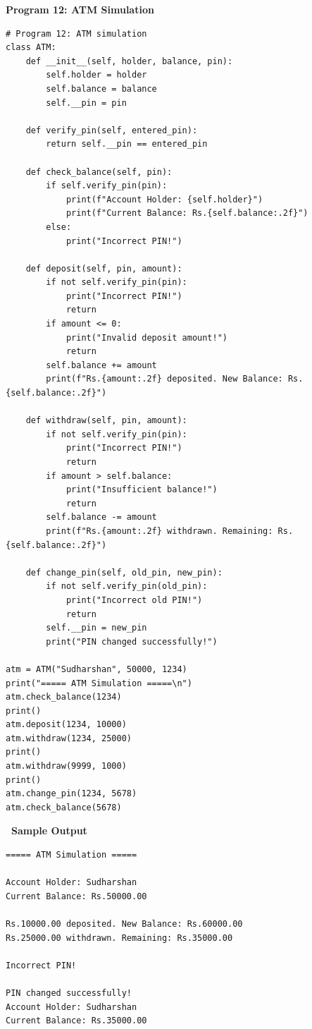 \documentclass[12pt,a4paper]{article}
\newcommand{\outhead}{\noindent\colorbox{cmrgreen!25}%
  {\textbf{\small\color{cmrdark}~Sample Output~}}\par\vspace{-1pt}}
\begin{document}
\vspace{0.5cm}

\textbf{Program 12: ATM Simulation}

\begin{lstlisting}
# Program 12: ATM simulation
class ATM:
    def __init__(self, holder, balance, pin):
        self.holder = holder
        self.balance = balance
        self.__pin = pin

    def verify_pin(self, entered_pin):
        return self.__pin == entered_pin

    def check_balance(self, pin):
        if self.verify_pin(pin):
            print(f"Account Holder: {self.holder}")
            print(f"Current Balance: Rs.{self.balance:.2f}")
        else:
            print("Incorrect PIN!")

    def deposit(self, pin, amount):
        if not self.verify_pin(pin):
            print("Incorrect PIN!")
            return
        if amount <= 0:
            print("Invalid deposit amount!")
            return
        self.balance += amount
        print(f"Rs.{amount:.2f} deposited. New Balance: Rs.{self.balance:.2f}")

    def withdraw(self, pin, amount):
        if not self.verify_pin(pin):
            print("Incorrect PIN!")
            return
        if amount > self.balance:
            print("Insufficient balance!")
            return
        self.balance -= amount
        print(f"Rs.{amount:.2f} withdrawn. Remaining: Rs.{self.balance:.2f}")

    def change_pin(self, old_pin, new_pin):
        if not self.verify_pin(old_pin):
            print("Incorrect old PIN!")
            return
        self.__pin = new_pin
        print("PIN changed successfully!")

atm = ATM("Sudharshan", 50000, 1234)
print("===== ATM Simulation =====\n")
atm.check_balance(1234)
print()
atm.deposit(1234, 10000)
atm.withdraw(1234, 25000)
print()
atm.withdraw(9999, 1000)
print()
atm.change_pin(1234, 5678)
atm.check_balance(5678)
\end{lstlisting}

\outhead
\begin{lstlisting}[style=outputstyle]
===== ATM Simulation =====

Account Holder: Sudharshan
Current Balance: Rs.50000.00

Rs.10000.00 deposited. New Balance: Rs.60000.00
Rs.25000.00 withdrawn. Remaining: Rs.35000.00

Incorrect PIN!

PIN changed successfully!
Account Holder: Sudharshan
Current Balance: Rs.35000.00
\end{lstlisting}
\end{document}
